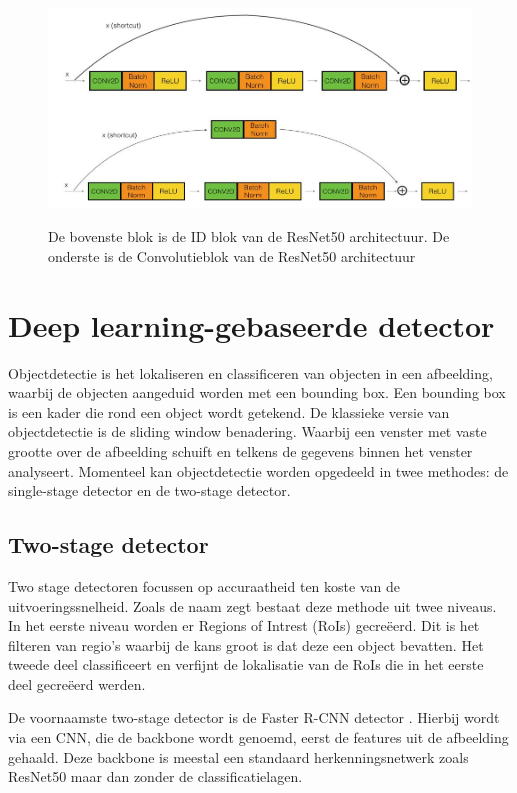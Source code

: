 \begin{figure}[!ht]
	\centering
	\includegraphics[width=1.0\linewidth]{fig/resnet_blokken.jpg}
	\caption{De bovenste blok is de ID blok van de ResNet50 architectuur. De onderste is de Convolutieblok van de ResNet50 architectuur}
	\label{fig:resnet_b}
	\cite{Raghunandepu_resnet_2019}
\end{figure}

\section{Deep learning-gebaseerde detector}
Objectdetectie is het lokaliseren en classificeren van objecten in een afbeelding, waarbij de objecten aangeduid worden met een bounding box.
Een bounding box is een kader die rond een object wordt getekend. 
De klassieke versie van objectdetectie is de sliding window benadering.
Waarbij een venster met vaste grootte over de afbeelding schuift en telkens de gegevens binnen het venster analyseert.
Momenteel kan objectdetectie worden opgedeeld in twee methodes: de single-stage detector en de two-stage detector.

\subsection{Two-stage detector}
Two stage detectoren focussen op accuraatheid ten koste van de uitvoeringssnelheid.
Zoals de naam zegt bestaat deze methode uit twee niveaus. 
In het eerste niveau worden er Regions of Intrest (RoIs) gecre\"eerd.
Dit is het filteren van regio's waarbij de kans groot is dat deze een object bevatten. 
Het tweede deel classificeert en verfijnt de lokalisatie van de RoIs die in het eerste deel gecre\"eerd werden. 

De voornaamste two-stage detector is de Faster R-CNN detector \cite{ren_faster_2016}. 
Hierbij wordt via een CNN, die de backbone wordt genoemd, eerst de features uit de afbeelding gehaald.
Deze backbone is meestal een standaard herkenningsnetwerk zoals ResNet50 maar dan zonder de classificatielagen.

